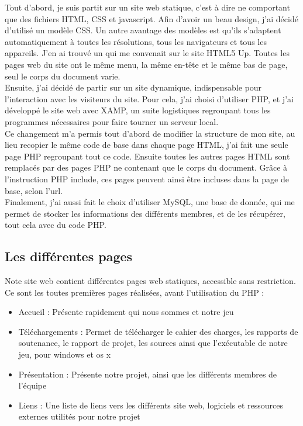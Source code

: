 \documentclass[12pt]{article}
\begin{document}
Tout d'abord, je suis partit sur un site web statique, c'est à dire ne comportant que des fichiers HTML, CSS et javascript. Afin d'avoir un beau design, j'ai décidé d'utilisé un modèle CSS. Un autre avantage des modèles est qu'ils s'adaptent automatiquement à toutes les résolutions, tous les navigateurs et tous les appareils. J'en ai trouvé un qui me convenait sur le site HTML5 Up. Toutes les pages web du site ont le même menu, la même en-tête et le même bas de page, seul le corps du document varie.\\

Ensuite, j'ai décidé de partir sur un site dynamique, indispensable pour l'interaction avec les visiteurs du site. Pour cela, j'ai choisi d'utiliser PHP, et j'ai développé le site web avec XAMP, un suite logistiques regroupant tous les programmes nécessaires pour faire tourner un serveur local.\\
Ce changement m'a permis tout d'abord de modifier la structure de mon site, au lieu recopier le même code de base dans chaque page HTML, j'ai fait une seule page PHP regroupant tout ce code. Ensuite toutes les autres pages HTML sont remplacés par des pages PHP ne contenant que le corps du document. Grâce à l'instruction PHP include, ces pages peuvent ainsi être incluses dans la page de base, selon l'url.\\
Finalement, j'ai aussi fait le choix d'utiliser MySQL, une base de donnée, qui me permet de stocker les informations des différents membres, et de les récupérer, tout cela avec du code PHP.

\subsection{Les différentes pages}

Note site web contient différentes pages web statiques,  accessible sans restriction. Ce sont les toutes premières pages réalisées, avant l'utilisation du PHP :

\begin{itemize}
\item Accueil : Présente rapidement qui nous sommes et notre jeu
\item Téléchargements : Permet de télécharger le cahier des charges, les rapports de soutenance, le rapport de projet, les sources ainsi que l'exécutable de notre jeu, pour windows et os x
\item Présentation : Présente notre projet, ainsi que les différents membres de l'équipe
\item Liens : Une liste de liens vers les différents site web, logiciels et ressources externes utilités pour notre projet
\end{itemize}
\end{document}
